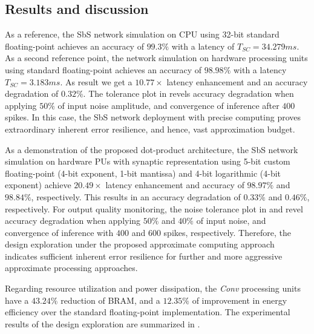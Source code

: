 \subsection{Results and discussion}
As a reference, the SbS network simulation on CPU using 32-bit standard floating-point achieves an accuracy of $99.3\%$ with a latency of $T_{SC} = 34.279ms$. As a second reference point, the network simulation on hardware processing units using standard floating-point achieves an accuracy of $98.98\%$ with a latency $T_{SC}=3.183ms$. As result we get a $10.77\times$ latency enhancement and an accuracy degradation of $0.32\%$. The tolerance plot in  revels accuracy degradation when applying $50\%$ of input noise amplitude, and convergence of inference after $400$ spikes. In this case, the SbS network deployment with precise computing proves extraordinary inherent error resilience, and hence, vast approximation budget.

As a demonstration of the proposed dot-product architecture, the SbS network simulation on hardware PUs with synaptic representation using 5-bit custom floating-point (4-bit exponent, 1-bit mantissa) and 4-bit logarithmic (4-bit exponent) achieve $20.49\times$ latency enhancement and accuracy of $98.97\%$ and $98.84\%$, respectively. This results in an accuracy degradation of $0.33\%$ and $0.46\%$, respectively. For output quality monitoring, the noise tolerance plot in  and  revel accuracy degradation when applying $50\%$ and $40\%$ of input noise, and convergence of inference with $400$ and $600$ spikes, respectively. Therefore, the design exploration under the proposed approximate computing approach indicates sufficient inherent error resilience for further and more aggressive approximate processing approaches.

Regarding resource utilization and power dissipation, the \emph{Conv} processing units have a $43.24\%$ reduction of BRAM, and a $12.35\%$ of improvement in energy efficiency over the standard floating-point implementation. The experimental results of the design exploration are summarized in .

